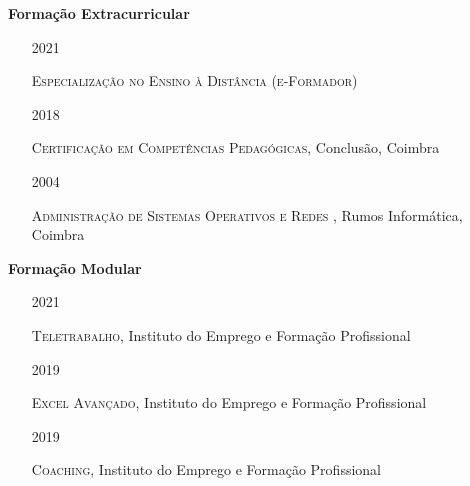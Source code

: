 \documentclass[10pt,a4paper,oneside]{article}
\newlength{\datewidth}
\newlength{\textindent}
\begin{document}
	\textbf{\hspace{\textindent}Formação Extracurricular}
	\begin{itemize}
		\item[\hspace{\datewidth}\scriptsize 2021] \parbox[t]{\dimexpr\linewidth-\datewidth-\textindent}{\textsc{Especialização no Ensino à Distância (e-Formador)}}
		\item[\hspace{\datewidth}\scriptsize 2018] \parbox[t]{\dimexpr\linewidth-\datewidth-\textindent}{\textsc{Certificação em Competências Pedagógicas}, Conclusão, Coimbra}
		\item[\hspace{\datewidth}\scriptsize 2004] \parbox[t]{\dimexpr\linewidth-\datewidth-\textindent}{\textsc{Administração de Sistemas Operativos e Redes }, Rumos Informática, Coimbra}
	\end{itemize}
	
	\vspace{5mm}
	
	\textbf{\hspace{\textindent}Formação Modular}
	\begin{itemize}
		\item[\hspace{\datewidth}\scriptsize 2021] \parbox[t]{\dimexpr\linewidth-\datewidth-\textindent}{\textsc{Teletrabalho}, Instituto do Emprego e Formação Profissional}
		\item[\hspace{\datewidth}\scriptsize 2019] \parbox[t]{\dimexpr\linewidth-\datewidth-\textindent}{\textsc{Excel Avançado}, Instituto do Emprego e Formação Profissional}
		\item[\hspace{\datewidth}\scriptsize 2019] \parbox[t]{\dimexpr\linewidth-\datewidth-\textindent}{\textsc{Coaching}, Instituto do Emprego e Formação Profissional}

	\end{itemize}
	
		\vspace{5mm}	
	
\end{document}

